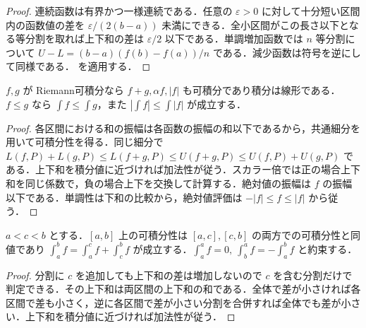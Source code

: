 \begin{proof}
連続函数は有界かつ一様連続である．任意の $\varepsilon>0$ に対して十分短い区間内の函数値の差を $\varepsilon/(2(b-a))$ 未満にできる．全小区間がこの長さ以下となる等分割を取れば上下和の差は $\varepsilon/2$ 以下である．単調増加函数では $n$ 等分割について $U-L=(b-a)(f(b)-f(a))/n$ である．減少函数は符号を逆にして同様である． を適用する．
\end{proof}
\begin{prop}[積分の線形性と単調性]
$f,g$ が Riemann可積分なら $f+g,\alpha f,|f|$ も可積分であり積分は線形である．$f\leq g$ なら $\int f\leq\int g$，また $|\int f|\leq\int|f|$ が成立する．
\end{prop}
\begin{proof}
各区間における和の振幅は各函数の振幅の和以下であるから，共通細分を用いて可積分性を得る．同じ細分で $L(f,P)+L(g,P)\leq L(f+g,P)\leq U(f+g,P)\leq U(f,P)+U(g,P)$ である．上下和を積分値に近づければ加法性が従う．スカラー倍では正の場合上下和を同じ係数で，負の場合上下を交換して計算する．絶対値の振幅は $f$ の振幅以下である．単調性は下和の比較から，絶対値評価は $-|f|\leq f\leq|f|$ から従う．
\end{proof}
\begin{prop}[区間に関する積分の加法性]
$a<c<b$ とする．$[a,b]$ 上の可積分性は $[a,c],[c,b]$ の両方での可積分性と同値であり $\int_a^b f=\int_a^c f+\int_c^b f$ が成立する．$\int_a^a f=0,\ \int_b^a f=-\int_a^b f$ と約束する．
\end{prop}
\begin{proof}
分割に $c$ を追加しても上下和の差は増加しないので $c$ を含む分割だけで判定できる．その上下和は両区間の上下和の和である．全体で差が小さければ各区間で差も小さく，逆に各区間で差が小さい分割を合併すれば全体でも差が小さい．上下和を積分値に近づければ加法性が従う．
\end{proof}
